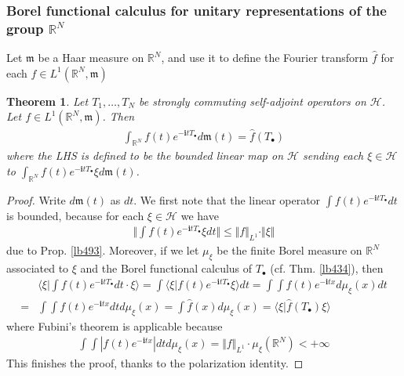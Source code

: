 \documentclass[12pt,b5paper,notitlepage]{article}
\theoremstyle{definition}
\theoremstyle{plain}
\newtheorem{thm}[df]{Theorem}
\DeclareMathOperator{\Borb}{{\mathscr{B}\text{\kern -2pt {\calligra\large or}}\,}_{\mathrm b}}
\newcommand{\fk}{\mathfrak}
\newcommand{\wht}{\widehat}
\newcommand{\bk}[1]{\langle {#1}\rangle}
\newcommand{\Bigbk}[1]{\Big\langle {#1}\Big\rangle}
\newcommand{\im}{\mathbf{i}}
\newcommand{\blt}{\bullet}
\newcommand{\Rbb}{\mathbb R}
\newcommand{\mk}{\mathfrak m}
\newcommand{\MH}{\mathcal H}
\newcommand{\MK}{\mathcal K}
\numberwithin{equation}{section}
\begin{document}


\subsubsection{Borel functional calculus for unitary representations of the group $\Rbb^N$}


Let $\mk$ be a Haar measure on $\Rbb^N$, and use it to define the Fourier transform $\wht f$ for each $f\in L^1(\Rbb^N,\mk)$

\begin{thm}\label{lb531}
Let $T_1,\dots,T_N$ be strongly commuting self-adjoint operators on $\MH$. Let $f\in L^1(\Rbb^N,\mk)$. Then
\begin{align*}
\int_{\Rbb^N}f(t)e^{-\im tT_\blt}d\mk(t)=\wht f(T_\blt)
\end{align*}
where the LHS is defined to be the bounded linear map on $\MH$ sending each $\xi\in\MH$ to $\int_{\Rbb^N}f(t)e^{-\im tT_\blt}\xi d\mk(t)$.
\end{thm}


\begin{proof}
Write $d\mk(t)$ as $dt$. We first note that the linear operator $\int f(t)e^{-\im tT_\blt}dt$ is bounded, because for each $\xi\in\MH$ we have
\begin{align*}
\Big\Vert \int f(t)e^{-\im tT_\blt}\xi dt\Big\Vert\leq \Vert f\Vert_{L^1}\cdot\Vert\xi\Vert
\end{align*}
due to Prop. \ref{lb493}. Moreover, if we let $\mu_\xi$ be the finite Borel measure on $\Rbb^N$ associated to $\xi$ and the Borel functional calculus of $T_\blt$ (cf. Thm. \ref{lb434}), then
\begin{align*}
&\Bigbk{\xi\Big|\int f(t)e^{-\im tT_\blt}dt\cdot \xi}=\int\bk{\xi|f(t)e^{-\im tT_\blt}\xi}dt=\int\int f(t)e^{-\im tx}d\mu_\xi(x)dt\\
=&\int\int f(t)e^{-\im tx}dtd\mu_\xi(x)=\int \wht f(x)d\mu_\xi(x)=\bk{\xi|\wht f(T_\blt)\xi}
\end{align*}
where Fubini's theorem is applicable because
\begin{align*}
\int\int |f(t)e^{-\im tx}|dtd\mu_\xi(x)=\Vert f\Vert_{L^1}\cdot\mu_\xi(\Rbb^N)<+\infty
\end{align*}
This finishes the proof, thanks to the polarization identity.
\end{proof}
\end{document}
